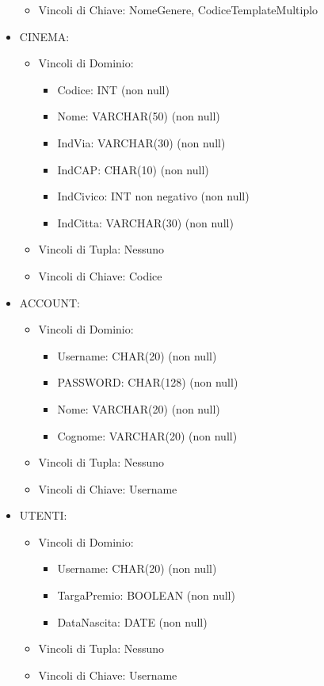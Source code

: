 \documentclass[a4paper,12pt]{report}
\begin{document}
\begin{itemize}
\begin{itemize}
		\item Vincoli di Chiave: NomeGenere, CodiceTemplateMultiplo
	\end{itemize}
	\item CINEMA:
	\begin{itemize}
		\item Vincoli di Dominio:
		\begin{itemize}
			\item Codice: INT (non null)
			\item Nome: VARCHAR(50) (non null)
			\item IndVia: VARCHAR(30) (non null)
			\item IndCAP: CHAR(10) (non null)
			\item IndCivico: INT non negativo (non null)
			\item IndCitta: VARCHAR(30) (non null)
		\end{itemize}
		\item Vincoli di Tupla: Nessuno
		\item Vincoli di Chiave: Codice
	\end{itemize}
	\item ACCOUNT:
	\begin{itemize}
		\item Vincoli di Dominio:
		\begin{itemize}
			\item Username: CHAR(20) (non null)
			\item PASSWORD: CHAR(128) (non null)
			\item Nome: VARCHAR(20) (non null)
			\item Cognome: VARCHAR(20) (non null)
		\end{itemize}
		\item Vincoli di Tupla: Nessuno
		\item Vincoli di Chiave: Username
	\end{itemize}
	\item UTENTI:
	\begin{itemize}
		\item Vincoli di Dominio:
		\begin{itemize}
			\item Username: CHAR(20) (non null)
			\item TargaPremio: BOOLEAN (non null)
			\item DataNascita: DATE (non null)
		\end{itemize}
		\item Vincoli di Tupla: Nessuno
		\item Vincoli di Chiave: Username

\end{itemize}
\end{itemize}
\end{document}
